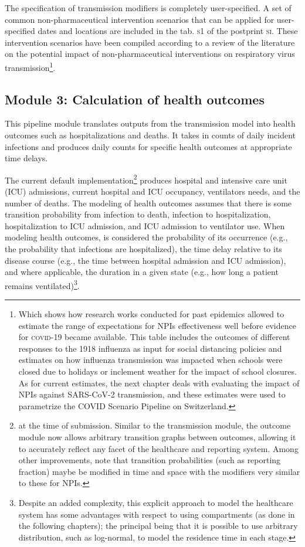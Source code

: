 {The specification of transmission modifiers is completely user-specified. A set of common non-pharmaceutical intervention scenarios that can be applied for user-specified dates and locations are included in the tab. \textsc{s1} of the postprint \textsc{si}. These intervention scenarios have been compiled according to a review of the literature on the potential impact of non-pharmaceutical interventions on respiratory virus transmission\footnote{Which shows how research works conducted for past epidemics allowed to estimate the range of expectations for NPIs effectiveness well before evidence for \textsc{covid}-19 became available. This table includes \eg the outcomes of different responses to the 1918 influenza as input for social distancing policies and estimates on how influenza transmission was impacted when schools were closed due to holidays or inclement weather for the impact of school closures. As for current estimates, the next chapter deals with evaluating the impact of NPIs against SARS-CoV-2 transmission, and these estimates were used to parametrize the COVID Scenario Pipeline on Switzerland.}.

\subsection{Module 3: Calculation of health outcomes}
This pipeline module translates outputs from the transmission model into health outcomes such as hospitalizations and deaths. It takes in counts of daily incident infections and produces daily counts for specific health outcomes at appropriate time delays.

The current default implementation\footnote{at the time of submission. Similar to the transmission module, the outcome module now allows arbitrary transition graphs between outcomes, allowing it to accurately reflect any facet of the healthcare and reporting system. Among other improvements, note that transition probabilities (such as reporting fraction) maybe be modified in time and space with the modifiers very similar to these for NPIs.} produces hospital and intensive care unit (ICU) admissions, current hospital and ICU occupancy, ventilators needs, and the number of deaths. The modeling of health outcomes assumes that there is some transition probability from infection to death, infection to hospitalization, hospitalization to ICU admission, and ICU admission to ventilator use. When modeling health outcomes, is considered the probability of its occurrence (e.g., the probability that infections are hospitalized), the time delay relative to its disease course (e.g., the time between hospital admission and ICU admission), and where applicable, the duration in a given state (e.g., how long a patient remains ventilated)\footnote{Despite an added complexity, this explicit approach to model the healthcare system has some advantages with respect to using compartments (as done in the following chapters); the principal being that it is possible to use arbitrary distribution,  such as log-normal, to model the residence time in each stage.}.

}
